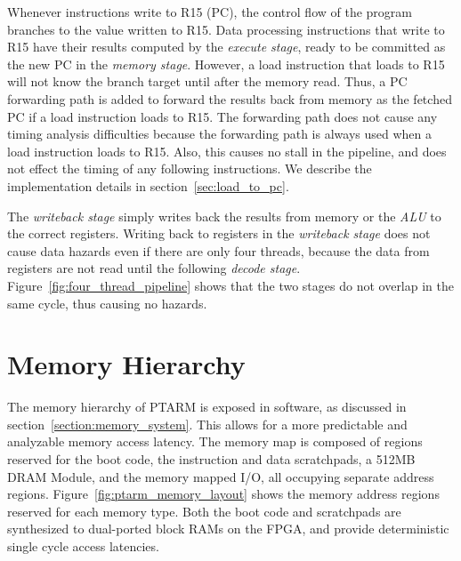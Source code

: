 Whenever instructions write to R15 (PC), the control flow of the program branches to the value written to R15.
Data processing instructions that write to R15 have their results computed by the \emph{execute stage}, ready to be committed as the new PC in the \emph{memory stage}.    
However, a load instruction that loads to R15 will not know the branch target until after the memory read.
Thus, a PC forwarding path is added to forward the results back from memory as the fetched PC if a load instruction loads to R15.  
The forwarding path does not cause any timing analysis difficulties because the forwarding path is always used when a load instruction loads to R15.
Also, this causes no stall in the pipeline, and does not effect the timing of any following instructions.
We describe the implementation details in section~\ref{sec:load_to_pc}. 

The \emph{writeback stage} simply writes back the results from memory or the \emph{ALU} to the correct registers.
Writing back to registers in the \emph{writeback stage} does not cause data hazards even if there are only four threads, because the data from registers are not read until the following \emph{decode stage}.
Figure~\ref{fig:four_thread_pipeline} shows that the two stages do not overlap in the same cycle, thus causing no hazards.  

\section{Memory Hierarchy}
\label{sec:ptarm_memory}
The memory hierarchy of PTARM is exposed in software, as discussed in section~\ref{section:memory_system}.
This allows for a more predictable and analyzable memory access latency. 
The memory map is composed of regions reserved for the boot code, the instruction and data scratchpads, a 512MB DRAM Module, and the memory mapped I/O, all occupying separate address regions.
Figure~\ref{fig:ptarm_memory_layout} shows the memory address regions reserved for each memory type.
Both the boot code and scratchpads are synthesized to dual-ported block RAMs on the FPGA, and provide deterministic single cycle access latencies.

